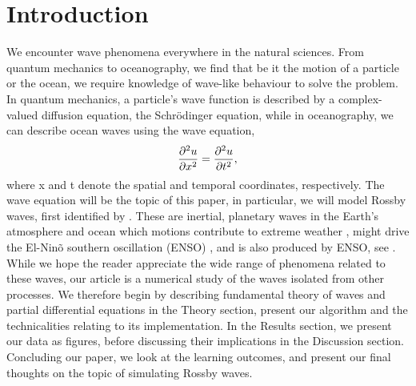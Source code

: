 \section{Introduction}
\label{sec:introduction}

We encounter wave phenomena everywhere in the natural sciences. From quantum mechanics to oceanography, we find that be it the motion of a particle or the ocean, we require knowledge of wave-like behaviour to solve the problem. In quantum mechanics, a particle's wave function is described by a complex-valued diffusion equation, the Schrödinger equation, while in oceanography, we can describe ocean waves using the wave equation,
	\begin{equation}
	\label{eq:wave}
	\pdv[2]{u}{x} = \pdv[2]{u}{t},
	\end{equation}
where x and t denote the spatial and temporal coordinates, respectively. The wave equation will be the topic of this paper, in particular, we will model Rossby waves, first identified by \citet{rossby}. These are inertial, planetary waves in the Earth's atmosphere and ocean which motions contribute to extreme weather \citep{mann2017influence}, might drive the El-Ninõ southern oscillation (ENSO) \citep{bosc2008observed}, and is also produced by ENSO, see \citet{battisti1989role}. While we hope the reader appreciate the wide range of phenomena related to these waves, our article is a numerical study of the waves isolated from other processes. We therefore begin by describing fundamental theory of waves and partial differential equations in the Theory section, present our algorithm and the technicalities relating to its implementation. In the Results section, we present our data as figures, before discussing their implications in the Discussion section. Concluding our paper, we look at the learning outcomes, and present our final thoughts on the topic of simulating Rossby waves.